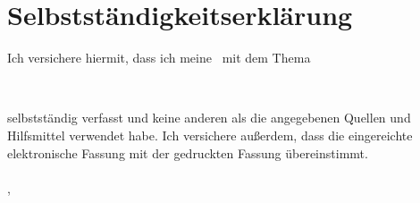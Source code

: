 
\newpage
\section*{Selbstständigkeitserklärung}
Ich versichere hiermit, dass ich meine \mytexttype \ mit dem Thema
\begin{center}
\textbf{{\large \mytitle} \\ \mysubtitle}
\end{center}
selbstständig verfasst und keine anderen als die angegebenen Quellen und Hilfsmittel verwendet habe. Ich versichere außerdem, dass die eingereichte elektronische Fassung mit der gedruckten Fassung übereinstimmt.\\
\\
\vspace{15mm}
\noindent{}\mysubmissionplace , \mydate
\hfill
\begin{minipage}[t]{6cm}
\centering \dotfill \\
\myauthor
\end{minipage}